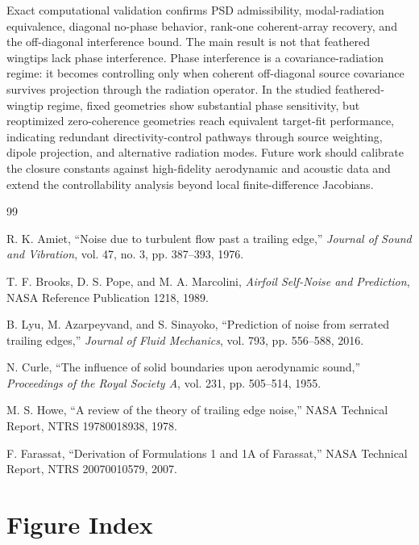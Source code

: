 \documentclass[11pt]{article}
\begin{document}
Exact computational validation confirms PSD admissibility, modal-radiation equivalence, diagonal no-phase behavior, rank-one coherent-array recovery, and the off-diagonal interference bound. The main result is not that feathered wingtips lack phase interference. Phase interference is a covariance-radiation regime: it becomes controlling only when coherent off-diagonal source covariance survives projection through the radiation operator. In the studied feathered-wingtip regime, fixed geometries show substantial phase sensitivity, but reoptimized zero-coherence geometries reach equivalent target-fit performance, indicating redundant directivity-control pathways through source weighting, dipole projection, and alternative radiation modes. Future work should calibrate the closure constants against high-fidelity aerodynamic and acoustic data and extend the controllability analysis beyond local finite-difference Jacobians.

\begin{thebibliography}{99}

R. K. Amiet,
``Noise due to turbulent flow past a trailing edge,''
\emph{Journal of Sound and Vibration},
vol. 47, no. 3, pp. 387--393, 1976.

T. F. Brooks, D. S. Pope, and M. A. Marcolini,
\emph{Airfoil Self-Noise and Prediction},
NASA Reference Publication 1218, 1989.

B. Lyu, M. Azarpeyvand, and S. Sinayoko,
``Prediction of noise from serrated trailing edges,''
\emph{Journal of Fluid Mechanics},
vol. 793, pp. 556--588, 2016.

N. Curle,
``The influence of solid boundaries upon aerodynamic sound,''
\emph{Proceedings of the Royal Society A},
vol. 231, pp. 505--514, 1955.

M. S. Howe,
``A review of the theory of trailing edge noise,''
NASA Technical Report, NTRS 19780018938, 1978.

F. Farassat,
``Derivation of Formulations 1 and 1A of Farassat,''
NASA Technical Report, NTRS 20070010579, 2007.

\end{thebibliography}

\clearpage
\appendix

\section{Figure Index}
\end{document}
